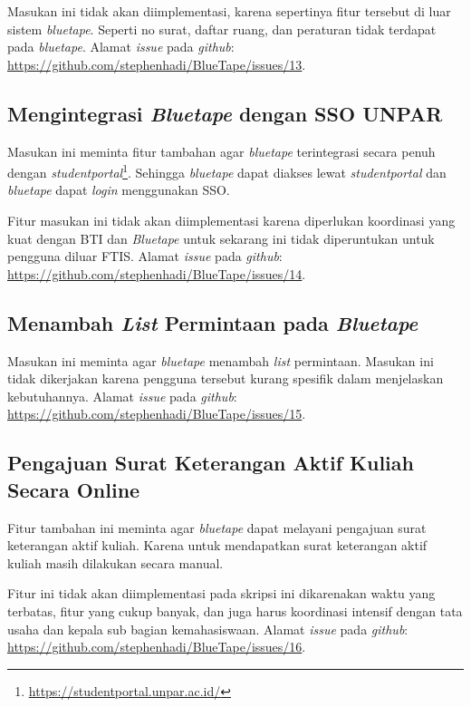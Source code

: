 Masukan ini tidak akan diimplementasi, karena sepertinya fitur tersebut di luar sistem \textit{bluetape}. Seperti no surat, daftar ruang, dan peraturan tidak terdapat pada \textit{bluetape}. Alamat \textit{issue} pada \textit{github}: \url{https://github.com/stephenhadi/BlueTape/issues/13}. 

\subsection{Mengintegrasi \textit{Bluetape} dengan SSO UNPAR}
\label{issue:14}
Masukan ini meminta fitur tambahan agar \textit{bluetape} terintegrasi secara penuh dengan \textit{studentportal}\footnote{\url{https://studentportal.unpar.ac.id/}}. Sehingga \textit{bluetape} dapat diakses lewat \textit{studentportal} dan \textit{bluetape} dapat \textit{login} menggunakan SSO.

Fitur masukan ini tidak akan diimplementasi karena diperlukan koordinasi yang kuat dengan BTI dan \textit{Bluetape} untuk sekarang ini tidak diperuntukan untuk pengguna diluar FTIS. Alamat \textit{issue} pada \textit{github}: \url{https://github.com/stephenhadi/BlueTape/issues/14}. 

\subsection{Menambah \textit{List} Permintaan pada \textit{Bluetape}}
\label{issue:15}
Masukan ini meminta agar \textit{bluetape} menambah \textit{list} permintaan. Masukan ini tidak dikerjakan karena pengguna tersebut kurang spesifik dalam menjelaskan kebutuhannya. Alamat \textit{issue} pada \textit{github}: \url{https://github.com/stephenhadi/BlueTape/issues/15}. 

\subsection{Pengajuan Surat Keterangan Aktif Kuliah Secara Online}
\label{issue:16}
Fitur tambahan ini meminta agar \textit{bluetape} dapat melayani pengajuan surat keterangan aktif kuliah. Karena untuk mendapatkan surat keterangan aktif kuliah masih dilakukan secara manual.

Fitur ini tidak akan diimplementasi pada skripsi ini dikarenakan waktu yang terbatas, fitur yang cukup banyak, dan juga harus koordinasi intensif dengan tata usaha dan kepala sub bagian kemahasiswaan. Alamat \textit{issue} pada \textit{github}: \url{https://github.com/stephenhadi/BlueTape/issues/16}.

